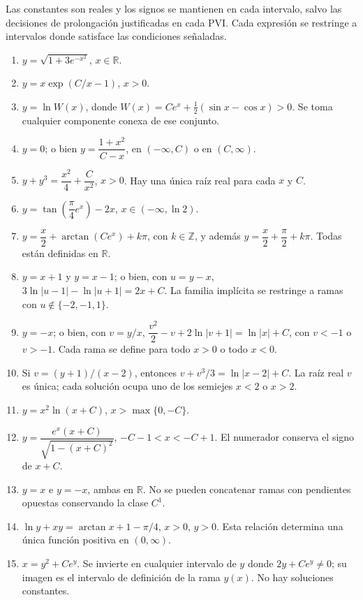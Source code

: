 Las constantes son reales y los signos se mantienen en cada intervalo, salvo las decisiones de prolongación justificadas en cada PVI. Cada expresión se restringe a intervalos donde satisface las condiciones señaladas.
\begin{enumerate}[label=\alph*)]
\item $y=\sqrt{1+3e^{-x^2}}$, \quad $x\in\mathbb R$.
\item $y=x\exp(C/x-1)$, \quad $x>0$.
\item $y=\ln W(x)$, donde $W(x)=Ce^x+\tfrac12(\sin x-\cos x)>0$. Se toma cualquier componente conexa de ese conjunto.
\item $y=0$; o bien $y=\dfrac{1+x^2}{C-x}$, en $(-\infty,C)$ o en $(C,\infty)$.
\item $y+y^3=\dfrac{x^2}{4}+\dfrac{C}{x^2}$, \quad $x>0$. Hay una única raíz real para cada $x$ y $C$.
\item $y=\tan\!\left(\dfrac\pi4e^x\right)-2x$, \quad $x\in(-\infty,\ln2)$.
\item $y=\dfrac{x}{2}+\arctan(Ce^x)+k\pi$, con $k\in\mathbb Z$, y además $y=\dfrac{x}{2}+\dfrac{\pi}{2}+k\pi$. Todas están definidas en $\mathbb R$.
\item $y=x+1$ y $y=x-1$; o bien, con $u=y-x$, $3\ln|u-1|-\ln|u+1|=2x+C$. La familia implícita se restringe a ramas con $u\notin\{-2,-1,1\}$.
\item $y=-x$; o bien, con $v=y/x$, $\dfrac{v^2}{2}-v+2\ln|v+1|=\ln|x|+C$, con $v<-1$ o $v>-1$. Cada rama se define para todo $x>0$ o todo $x<0$.
\item Si $v=(y+1)/(x-2)$, entonces $v+v^3/3=\ln|x-2|+C$. La raíz real $v$ es única; cada solución ocupa uno de los semiejes $x<2$ o $x>2$.
\item $y=x^2\ln(x+C)$, \quad $x>\max\{0,-C\}$.
\item $y=\dfrac{e^x(x+C)}{\sqrt{1-(x+C)^2}}$, \quad $-C-1<x<-C+1$. El numerador conserva el signo de $x+C$.
\item $y=x$ e $y=-x$, ambas en $\mathbb R$. No se pueden concatenar ramas con pendientes opuestas conservando la clase $C^1$.
\item $\ln y+xy=\arctan x+1-\pi/4$, \quad $x>0$, $y>0$. Esta relación determina una única función positiva en $(0,\infty)$.
\item $x=y^2+Ce^y$. Se invierte en cualquier intervalo de $y$ donde $2y+Ce^y\ne0$; su imagen es el intervalo de definición de la rama $y(x)$. No hay soluciones constantes.
\end{enumerate}
